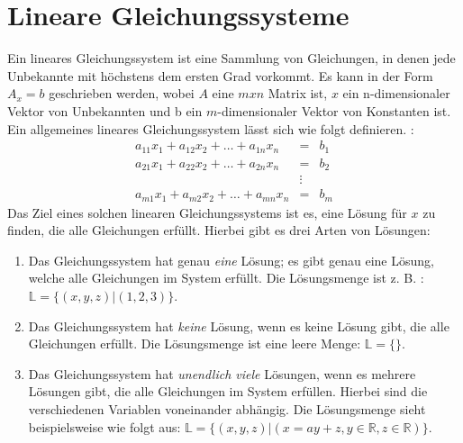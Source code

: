\documentclass[a4paper, 12pt]{report}
\begin{document}
\begin{sloppypar}
\section{Lineare Gleichungssysteme}
Ein lineares Gleichungssystem ist eine Sammlung von Gleichungen, in denen jede Unbekannte mit höchstens dem ersten Grad vorkommt.
Es kann in der Form $ A_x = b $ geschrieben werden, wobei $A$ eine $ m x n $ Matrix ist, $x$ ein n-dimensionaler Vektor von Unbekannten
und b ein $m$-dimensionaler Vektor von Konstanten ist.
Ein allgemeines lineares Gleichungssystem lässt sich wie folgt definieren. :
\begin{align}
\label{eq:linGle}
    a_{11}x_{1}+ a_{12}x_{2}+\hdots+ a_{1n}x_{n} &=& b_1 \nonumber \\
    a_{21}x_{1}+ a_{22}x_{2}+\hdots+ a_{2n}x_{n} &=& b_2 \nonumber\\
                                                 &\vdots&  \nonumber \\
    a_{m1}x_{1}+ a_{m2}x_2+\hdots+a_{mn}x_{n} &=& b_{m}
\end{align}
Das Ziel eines solchen linearen Gleichungssystems ist es, eine Lösung für $x$ zu finden, die alle Gleichungen erfüllt.
Hierbei gibt es drei Arten von Lösungen:
\begin{enumerate}
    \item Das Gleichungssystem hat genau \textit{eine} Lösung; es gibt genau eine Lösung, welche alle Gleichungen im System erfüllt. Die Lösungsmenge ist z. B. : $\mathbb{L} = \{ (x,y,z)| (1,2,3)\} $.
    \item Das Gleichungssystem hat \textit{keine} Lösung, wenn es keine Lösung gibt, die alle Gleichungen erfüllt. Die Lösungsmenge ist eine leere Menge: $\mathbb{L} = \{ \}$.
    \item Das Gleichungssystem hat \textit{unendlich viele} Lösungen, wenn es mehrere Lösungen gibt, die alle Gleichungen im System erfüllen.
        Hierbei sind die verschiedenen Variablen voneinander abhängig. Die Lösungsmenge sieht beispielsweise wie folgt aus: \newline $ \mathbb{L} = \{(x, y, z)| (x = ay + z, y\in \mathbb{R}, z \in \mathbb{R}) \} $.
\end{enumerate}



\end{sloppypar}
\end{document}
